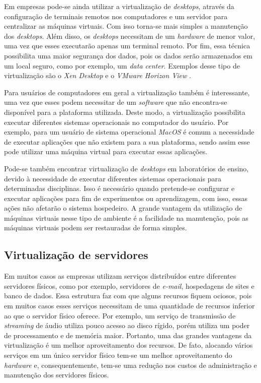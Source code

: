Em empresas pode-se ainda utilizar a virtualização de \textit{desktops}, através da configuração de terminais remotos nos computadores e um 
servidor para centralizar as máquinas virtuais. Com isso torna-se mais simples a manutenção dos \textit{desktops}. Além disso, os \textit{desktops} 
necessitam de um \textit{hardware} de menor valor, uma vez que esses executarão apenas um terminal remoto. Por fim, essa técnica possibilita uma 
maior segurança dos dados, pois os dados serão armazenados em um local seguro, como por exemplo, um \textit{data center}. Exemplos desse tipo de 
virtualização são o \textit{Xen Desktop} \cite{xendesktop} e o \textit{VMware Horizon View} \cite{vmwareview}.

Para usuários de computadores em geral a virtualização também é interessante, uma vez que esses podem necessitar de um \textit{software} que não
encontra-se disponível para a plataforma utilizada. Deste modo, a virtualização possibilita executar diferentes sistemas operacionais no computador do 
usuário. Por exemplo, para um usuário de sistema operacional \textit{MacOS} é comum a necessidade de executar aplicações que não existem para a 
sua plataforma, sendo assim esse pode utilizar uma máquina virtual para executar essas aplicações.

Pode-se também encontrar virtualização de \textit{desktops} em laboratórios de ensino, devido à necessidade de executar diferentes sistemas 
operacionais para determinadas disciplinas. Isso é necessário quando pretende-se configurar e executar aplicações para fim de experimentos ou
aprendizagem, com isso, essas ações não afetarão o sistema hospedeiro. A grande vantagem da utilização de máquinas virtuais nesse tipo de 
ambiente é a facilidade na manutenção, pois as máquinas virtuais podem ser restauradas de forma simples.

\subsection{Virtualização de servidores}
\label{section:virtserv}

Em muitos casos as empresas utilizam serviços distribuídos entre diferentes servidores físicos, como por exemplo, servidores de \textit{e-mail}, 
hospedagens de sites e banco de dados. Essa estrutura faz com que alguns recursos fiquem ociosos, pois em muitos casos esses serviços necessitam 
de uma quantidade de recursos inferior ao que o servidor físico oferece. Por exemplo, um serviço de transmissão de \textit{streaming} de áudio 
utiliza pouco acesso ao disco rígido, porém utiliza um poder de processamento e de memória  maior. Portanto, uma das grandes vantagens da 
virtualização é um melhor aproveitamento dos recursos. De fato, alocando vários serviços em um único servidor físico tem-se um melhor 
aproveitamento do \textit{hardware} \cite{moreira2006} e, consequentemente, tem-se uma redução nos custos de administração e manutenção 
dos servidores físicos.

